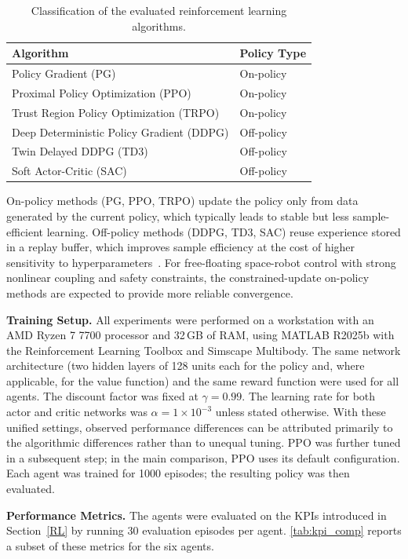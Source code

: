 \documentclass{ieeeaccess}
\begin{document}
\begin{table}[!t]
\centering
\caption{Classification of the evaluated reinforcement learning algorithms.}
\label{tab:on_off_policy}
\begin{tabular}{ll}
\toprule
\textbf{Algorithm} & \textbf{Policy Type} \\
\midrule
Policy Gradient (PG) & On-policy \\
Proximal Policy Optimization (PPO) & On-policy  \\
Trust Region Policy Optimization (TRPO) & On-policy  \\
Deep Deterministic Policy Gradient (DDPG) & Off-policy  \\
Twin Delayed DDPG (TD3) & Off-policy  \\
Soft Actor-Critic (SAC) & Off-policy  \\
\bottomrule
\end{tabular}
\end{table}
On-policy methods (PG, PPO, TRPO) update the policy only from data generated by the current policy, which typically leads to stable but less sample-efficient learning. Off-policy methods (DDPG, TD3, SAC) reuse experience stored in a replay buffer, which improves sample efficiency at the cost of higher sensitivity to hyperparameters~\cite{b2,b7}. For free-floating space-robot control with strong nonlinear coupling and safety constraints, the constrained-update on-policy methods are expected to provide more reliable convergence.

\textbf{Training Setup.} All experiments were performed on a workstation with an AMD Ryzen 7 7700 processor and 32\,GB of RAM, using MATLAB R2025b with the Reinforcement Learning Toolbox and Simscape Multibody. The same network architecture (two hidden layers of 128 units each for the policy and, where applicable, for the value function) and the same reward function were used for all agents. The discount factor was fixed at $\gamma = 0.99$. The learning rate for both actor and critic networks was $\alpha = 1 \times 10^{-3}$ unless stated otherwise. With these unified settings, observed performance differences can be attributed primarily to the algorithmic differences rather than to unequal tuning. PPO was further tuned in a subsequent step; in the main comparison, PPO uses its default configuration. Each agent was trained for 1000 episodes; the resulting policy was then evaluated.

\textbf{Performance Metrics.} The agents were evaluated on the KPIs introduced in Section~\ref{RL} by running 30 evaluation episodes per agent. \autoref{tab:kpi_comp} reports a subset of these metrics for the six agents.
\end{document}
